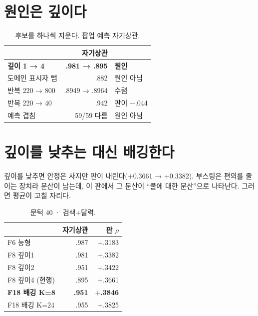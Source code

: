 \documentclass[10pt]{article}
\begin{document}

\section{원인은 깊이다}

\begin{table}[t]
\centering\tsize
\caption{후보를 하나씩 지운다. 팝업 예측 자기상관.}
\begin{tabular}{lrl}
\toprule
& 자기상관 & \\
\midrule
\textbf{깊이 1 → 4} & \textbf{.981 → .895} & \textbf{원인} \\
도메인 표시자 뺌 & .882 & 원인 아님 \\
반복 220 → 800 & .8949 → .8964 & 수렴 \\
반복 220 → 40 & .942 & 판이 $-$.044 \\
예측 겹침 & 59/59 다름 & 원인 아님 \\
\bottomrule
\end{tabular}
\end{table}


\section{깊이를 낮추는 대신 배깅한다}

깊이를 낮추면 안정은 사지만 판이 내린다($+$0.3661 → $+$0.3382). 부스팅은
편의를 줄이는 장치라 분산이 남는데, 이 판에서 그 분산이 ``풀에 대한
분산''으로 나타난다. 그러면 평균이 고칠 자리다.

\begin{table}[t]
\centering\tsize
\caption{문턱 40 · 검색$+$달력.}
\begin{tabular}{lrr}
\toprule
& 자기상관 & 판 $\rho$ \\
\midrule
F6 능형 & .987 & $+$.3183 \\
F8 깊이1 & .981 & $+$.3382 \\
F8 깊이2 & .951 & $+$.3422 \\
F8 깊이4 (현행) & .895 & $+$.3661 \\
\textbf{F18 배깅 K=8} & \textbf{.951} & \textbf{$+$.3846} \\
F18 배깅 K=24 & .955 & $+$.3825 \\
\bottomrule
\end{tabular}
\end{table}
\end{document}
